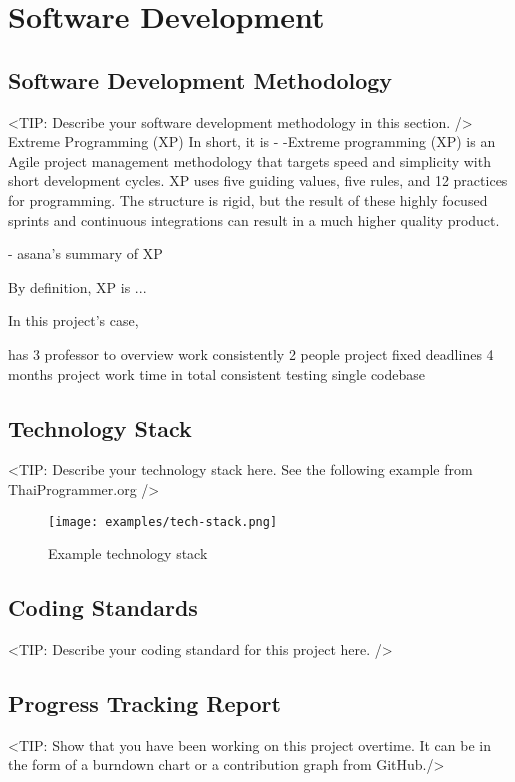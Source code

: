 \chapter{Software Development}
\label{chap:software-development}

\section{Software Development Methodology}
\label{section:software-development-methodology}
<TIP: Describe your software development methodology in this section. />
Extreme Programming (XP)
In short, it is -
-Extreme programming (XP) is an Agile project management methodology that targets speed and simplicity with short development cycles. XP uses five guiding values, five rules, and 12 practices for programming. The structure is rigid, but the result of these highly focused sprints and continuous integrations can result in a much higher quality product.

- asana's summary of XP 

By definition, XP is ...

In this project's case,


has 3 professor to overview work consistently
2 people project
fixed deadlines
4 months project work time in total
consistent testing
single codebase


\section{Technology Stack}
\label{section:technology-stack}
<TIP: Describe your technology stack here. See the following example from ThaiProgrammer.org />
\begin{figure}[h]
    \centering
    \texttt{[image: examples/tech-stack.png]}
    \caption{Example technology stack}
\end{figure}

\section{Coding Standards}
\label{section:coding-standards}
<TIP: Describe your coding standard for this project here. />

\section{Progress Tracking Report}
\label{section:progress-tracking-report}
<TIP: Show that you have been working on this project overtime.
It can be in the form of a burndown chart or a contribution graph from GitHub./>
